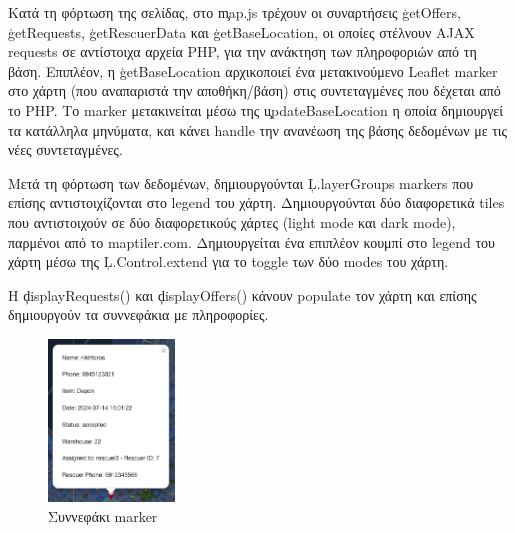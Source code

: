             Κατά τη φόρτωση της σελίδας, στο \c{map.js} τρέχουν οι συναρτήσεις \c{getOffers}, \c{getRequests}, \c{getRescuerData} και \c{getBaseLocation},
                οι οποίες στέλνουν AJAX requests σε αντίστοιχα αρχεία PHP, για την ανάκτηση των πληροφοριών από τη βάση.
            Επιπλέον, η \c{getBaseLocation} αρχικοποιεί ένα μετακινούμενο Leaflet marker στο χάρτη (που αναπαριστά την αποθήκη/βάση) στις συντεταγμένες που δέχεται από το PHP.
            Το marker μετακινείται μέσω της \c{updateBaseLocation} η οποία δημιουργεί τα κατάλληλα μηνύματα, και κάνει handle την ανανέωση της βάσης δεδομένων με τις νέες συντεταγμένες.

            Μετά τη φόρτωση των δεδομένων, δημιουργούνται \c{L.layerGroups} markers που επίσης αντιστοιχίζονται στο legend του χάρτη.
            Δημιουργούνται δύο διαφορετικά tiles που αντιστοιχούν σε δύο διαφορετικούς χάρτες (light mode και dark mode), παρμένοι από το maptiler.com.
            Δημιουργείται ένα επιπλέον κουμπί στο legend του χάρτη μέσω της \c{L.Control.extend} για το toggle των δύο modes του χάρτη.

            Η \c{displayRequests()} και \c{displayOffers()} κάνουν populate τον χάρτη και επίσης δημιουργούν τα συννεφάκια με πληροφορίες.

            \begin{figure}[H] \noindent \centering
                \includegraphics[width=0.3\textwidth]{img/admin-map-bubble}
                \caption{Συννεφάκι marker}
            \end{figure}
